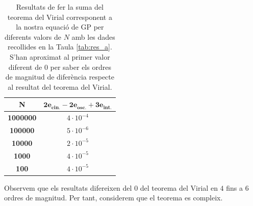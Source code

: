 \documentclass[a4paper]{article}
\begin{document}
\begin{table}[H]
\centering
\begin{tabular}{|c|c|}
\hline
\rowcolor[HTML]{EFEFEF}
\textbf{N} & $\mathbf{2e_{\text{cin.}}-2e_{\text{osc.}}+3 e_{\text{int.}}}$ \\ \hline\hline
\textbf{1000000}  & $4\cdot10^{-4}$      \\ \hline
\textbf{100000}   & $5\cdot10^{-6}$     \\ \hline
\textbf{10000}    & $2\cdot10^{-5}$     \\ \hline
\textbf{1000}     & $4\cdot10^{-5}$     \\ \hline
\textbf{100}      & $4\cdot10^{-5}$     \\ \hline
\end{tabular}
\caption{Resultats de fer la suma del teorema del Virial corresponent a la nostra equació de GP per diferents valors de $N$ amb les dades recollides en la Taula \ref{tab:res_a}. S'han aproximat al primer valor diferent de $0$ per saber els ordres de magnitud de diferència respecte al resultat del teorema del Virial.}
\label{tab:res_d}
\end{table}

Observem que els resultats difereixen del $0$ del teorema del Virial en $4$ fins a $6$ ordres de magnitud. Per tant, considerem que el teorema es compleix.
\end{document}
